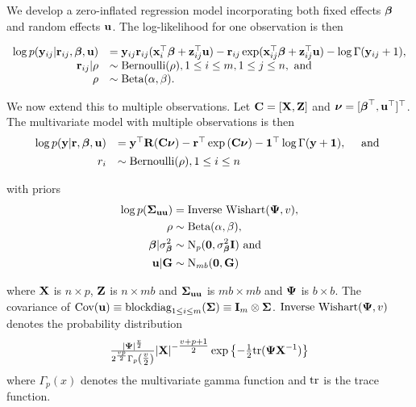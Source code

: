 We develop a zero-inflated regression model incorporating both fixed effects ${\boldsymbol \beta}$ and random effects
${\bf u}$. The log-likelihood for one observation is then

$$
	\begin{array}{rl}
		\log p({\bf y}_{ij} | {\bf r}_{ij}, {\boldsymbol \beta}, {\bf u}) & = {\bf y}_{ij} {\bf r}_{ij} ({\bf x}_i^\top {\boldsymbol\beta} + {\bf z}_{ij}^\top {\bf u}) - {\bf r}_{ij} \exp ({\bf x}_{ij}^\top {\boldsymbol\beta} + {\bf z}_{ij}^\top {\bf u}) - \log \Gamma ({\bf y}_{ij} + 1), \\
		{\bf r}_{ij} | \rho                  & \sim \text{Bernoulli}(\rho), 1 \leq i \leq m, 1 \leq j \leq n, \text{ and }                                                              \\
		\rho                        & \sim \text{Beta}(\alpha, \beta).                                                                                              \\
	\end{array}
$$

\noindent We now extend this to multiple observations. Let ${\bf C} = [{\bf X}, {\bf Z}]$ and ${\boldsymbol \nu} = [{\boldsymbol \beta}^\top, {\bf u}^\top]^\top$. The multivariate model with multiple observations is then
$$
	\begin{array}{rl}
		\log{p({\bf y}|{\bf r}, {\boldsymbol\beta}, {\bf u})} & = {\bf y}^\top {\bf R} ({\bf C}{\boldsymbol \nu}) - {\bf r}^\top \exp{({\bf C}{\boldsymbol\nu})} - {\bf 1}^\top \log{\Gamma{({\bf y}+ {\bf1})}}, \quad \mbox{ and } \\ [1ex]
		r_i                           & \sim \text{Bernoulli}(\rho), 1 \leq i \leq n                                                                     \\
	\end{array}
$$

\noindent with priors
\begin{align*}
	\log{p({\boldsymbol\Sigma}_{{\bf u}{\bf u}})} & = \text{Inverse Wishart}({\boldsymbol \Psi}, v),    \\
	\rho                       & \sim \text{Beta}(\alpha, \beta),             \\
	{\boldsymbol \beta}|\sigma^2_{\boldsymbol \beta}     & \sim \text{N}_p({\bf 0}, \sigma^2_{\boldsymbol \beta} {\bf I}) \text{ and } \\
	{\bf u}|{\bf G}       & \sim \text{N}_{mb}({\bf 0}, {\bf G})              
\end{align*}

\noindent where ${\bf X}$ is $n \times p$, ${\bf Z}$ is $n \times mb$ and ${\boldsymbol \Sigma}_{{\bf u} {\bf u}}$ is $mb \times mb$ and
${\boldsymbol \Psi}$ is $b \times b$. The covariance of $\mbox{Cov}({\bf u}) \equiv \text{blockdiag}_{1 \leq i \leq m} ({\boldsymbol \Sigma}) \equiv
{\bf I}_m \otimes {\boldsymbol\Sigma}$. $\text{Inverse Wishart}({\boldsymbol \Psi}, v)$ denotes the probability distribution
$$\tfrac{|{\boldsymbol \Psi}|^\frac{v}{2}}{2^{\frac{vp}{2}} \Gamma_p{\left(\tfrac{v}{2}\right)}} |{\bf X}|^{-\tfrac{v + p + 1}{2}}
\exp{\left\{-\tfrac{1}{2} \text{tr}{({\boldsymbol\Psi}{\bf X}^{-1})}\right\}}$$ where $\Gamma_p{(x)}$ denotes the multivariate gamma function and $\text{tr}$
is the trace function.

